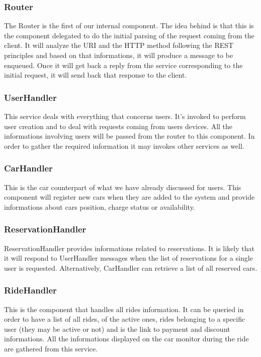 \pagebreak
\subsubsection{Router}
The Router is the first of our internal component. The idea behind is that this is the component
delegated to do the initial parsing of the request coming from the client. It will analyze
the URI and the HTTP method following the REST principles and based on that informations,
it will produce a message to be enqueued. Once it will get back a reply from the service
corresponding to the initial request, it will send back that response to the client.

\subsubsection{UserHandler}
This service deals with everything that concerns users. It's invoked to perform user creation
and to deal with requests coming from users devices. All the informations involving users
will be passed from the router to this component. In order to gather the required information
it may invokes other services as well.

\subsubsection{CarHandler}
This is the car counterpart of what we have already discussed for users. This component will
register new cars when they are added to the system and provide informations about cars
position, charge status or availability.

\subsubsection{ReservationHandler}
ReservationHandler provides informations related to reservations. It is likely that it will
respond to UserHandler messages when the list of reservations for a single user is requested.
Alternatively, CarHandler can retrieve a list of all reserved cars. 

\subsubsection{RideHandler}
This is the component that handles all rides information. It can be queried in order to have
a list of all rides, of the active ones, rides belonging to a specific user
(they may be active or not) and is the link to payment and discount informations. All the informations
displayed on the car monitor during the ride are gathered from this service.

